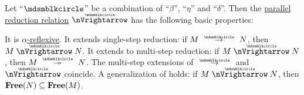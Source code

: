 \begin{proposition}\label{thm:def:parallel_reduction}
  Let \enquote{\( {\Anon} \)} be a combination of \enquote{\( \beta \)}, \enquote{\( \eta \)} and \enquote{\( \delta \)}. Then the \hyperref[def:parallel_reduction]{parallel reduction relation} \( {\ppred} \) has the following basic properties:
  \begin{thmenum}
     It is \hyperref[def:alpha_reflexive]{\( \alpha \)-reflexive}.
     It extends single-step reduction: if \( M \pred N \), then \( M \ppred N \).
     It extends to multi-step reduction: if \( M \ppred N \), then \( M \pred* N \).
     The multi-step extensions of \( {\pred} \) and \( {\ppred} \) coincide.
     A generalization of  holds: if \( M \ppred N \), then \( \op*{Free}(N) \subseteq \op*{Free}(M) \).
  \end{thmenum}
\end{proposition}
